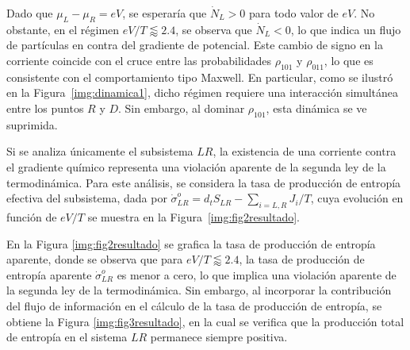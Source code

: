 Dado que $\mu_L - \mu_R = eV$, se esperaría que $\dot{N}_L > 0$ para todo valor de $eV$. No obstante, en el régimen $eV/T \lessapprox 2.4$, se observa que $\dot{N}_L < 0$, lo que indica un flujo de partículas en contra del gradiente de potencial. Este cambio de signo en la corriente coincide con el cruce entre las probabilidades $\rho_{101}$ y $\rho_{011}$, lo que es consistente con el comportamiento tipo Maxwell. En particular, como se ilustró en la Figura~\ref{img:dinamica1}, dicho régimen requiere una interacción simultánea entre los puntos $R$ y $D$. Sin embargo, al dominar $\rho_{101}$, esta dinámica se ve suprimida.

Si se analiza únicamente el subsistema $LR$, la existencia de una corriente contra el gradiente químico representa una violación aparente de la segunda ley de la termodinámica. Para este análisis, se considera la tasa de producción de entropía efectiva del subsistema, dada por $\dot{\sigma}^{o}_{LR} = d_{t}S_{LR} - \sum_{i=L,R} J_i/T$, cuya evolución en función de $eV/T$ se muestra en la Figura~\ref{img:fig2resultado}.




En la Figura \ref{img:fig2resultado} se grafica la tasa de producción de entropía aparente, donde se observa que para $eV/T \lessapprox 2.4$, la tasa de producción de entropía aparente $\dot{\sigma}^{o}_{LR}$ es menor a cero, lo que implica una violación aparente de la segunda ley de la termodinámica. Sin embargo, al incorporar la contribución del flujo de información en el cálculo de la tasa de producción de entropía, se obtiene la Figura \ref{img:fig3resultado}, en la cual se verifica que la producción total de entropía en el sistema $LR$ permanece siempre positiva.

